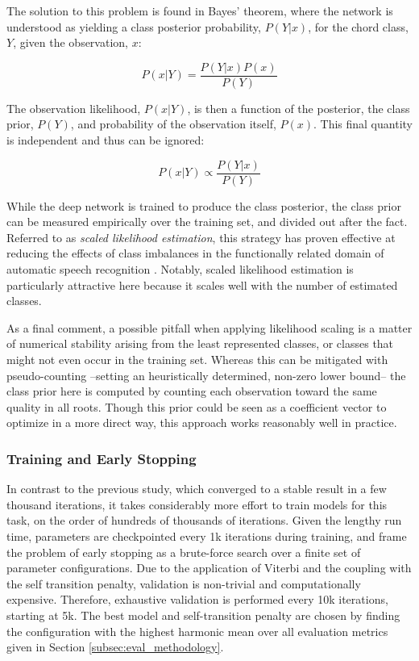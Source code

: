 The solution to this problem is found in Bayes' theorem, where the network is understood as yielding a class posterior probability, $P(Y|x)$, for the chord class, $Y$, given the observation, $x$:

\begin{equation}
P(x|Y) = \frac{P(Y|x)P(x)}{P(Y)}
\end{equation}

The observation likelihood, $P(x|Y)$, is then a function of the posterior, the class prior, $P(Y)$, and probability of the observation itself, $P(x)$.
This final quantity is independent and thus can be ignored:

\begin{equation}
P(x|Y) \varpropto \frac{P(Y|x)}{P(Y)}
\end{equation}

While the deep network is trained to produce the class posterior, the class prior can be measured empirically over the training set, and divided out after the fact.
Referred to as \emph{scaled likelihood estimation}, this strategy has proven effective at reducing the effects of class imbalances in the functionally related domain of automatic speech recognition \cite{Deng, others}.
Notably, scaled likelihood estimation is particularly attractive here because it scales well with the number of estimated classes.

As a final comment, a possible pitfall when applying likelihood scaling is a matter of numerical stability arising from the least represented classes, or classes that might not even occur in the training set.
Whereas this can be mitigated with pseudo-counting \cite{?} --setting an heuristically determined, non-zero lower bound-- the class prior here is computed by counting each observation toward the same quality in all roots.
Though this prior could be seen as a coefficient vector to optimize in a more direct way, this approach works reasonably well in practice.


\subsubsection{Training and Early Stopping}
\label{subsubsec:early_stopping}

In contrast to the previous study, which converged to a stable result in a few thousand iterations, it takes considerably more effort to train models for this task, on the order of hundreds of thousands of iterations.
Given the lengthy run time, parameters are checkpointed every 1k iterations during training, and frame the problem of early stopping as a brute-force search over a finite set of parameter configurations.
Due to the application of Viterbi and the coupling with the self transition penalty, validation is non-trivial and computationally expensive.
Therefore, exhaustive validation is performed every 10k iterations, starting at 5k.
The best model and self-transition penalty are chosen by finding the configuration with the highest harmonic mean over all evaluation metrics given in Section \ref{subsec:eval_methodology}.


